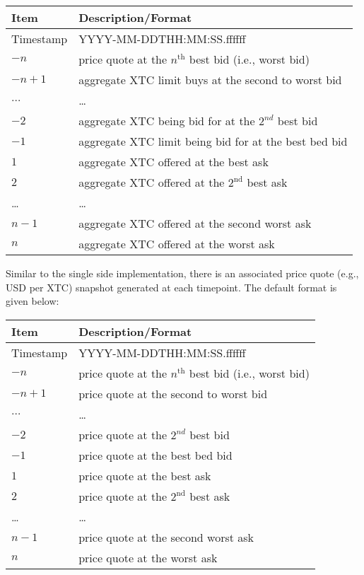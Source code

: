 \begin{center}
	\begin{tabular}{|l|l|}
		\hline
		Item & Description/Format \\
		\hline
		Timestamp & YYYY-MM-DDTHH:MM:SS.ffffff\\ 
		$-n$ & price quote at the $n^{\text{th}}$ best bid (i.e., worst bid) \\
		$-n+1$ & aggregate XTC limit buys at the second to worst bid \\
		$\ldots$ & \ldots \\
		$-2$ & aggregate XTC being bid for at the $2^{nd}$ best bid \\
		$-1$ & aggregate XTC limit being bid for at the best bed bid \\
		$1$ & aggregate XTC offered at the best ask\\
		$2$ & aggregate XTC offered at the $2^{\text{nd}}$ best ask\\
		\ldots & \ldots \\
		$n-1$ & aggregate XTC offered at the second worst ask \\
		$n$ & aggregate XTC offered at the worst ask \\
		\hline
	\end{tabular}
\end{center}


Similar to the single side implementation, there is an associated price quote  (e.g., USD per XTC) snapshot generated at each timepoint. The default format is given below:

\begin{center}
	\begin{tabular}{|l|l|}
		\hline
		Item & Description/Format \\
		\hline
		Timestamp & YYYY-MM-DDTHH:MM:SS.ffffff\\ $-n$ & price quote at the $n^{\text{th}}$ best bid (i.e., worst bid) \\
		$-n+1$ & price quote at the second to worst bid \\
		$\ldots$ & \ldots \\
		$-2$ & price quote at the $2^{nd}$ best bid \\
		$-1$ & price quote at the best bed bid \\
		$1$ & price quote at the best ask\\
		$2$ & price quote at the $2^{\text{nd}}$ best ask\\
		\ldots & \ldots \\
		$n-1$ & price quote at the second worst ask \\
		$n$ & price quote at the worst ask \\
		\hline
	\end{tabular}
\end{center}

